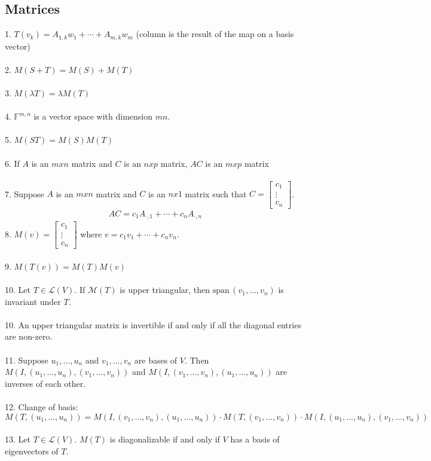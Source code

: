\documentclass[11pt,reqno]{article}
\newcommand{\spn}{\mathrm{span\,}}
\newcommand{\F}{\mathbb{F}}
\theoremstyle{definition}
\begin{document}
\subsection*{Matrices}
1. $T(v_k) = A_{1,k}w_1 + \cdots + A_{m,k}w_m$ (column is the result of the map on a basis vector)\\\\
2. $M(S+T) = M(S) + M(T)$\\\\
3. $M(\lambda T) = \lambda M(T)$\\\\
4. $\F^{m,n}$ is a vector space with dimension $mn$.\\\\
5. $M(ST) = M(S)M(T)$\\\\
6. If $A$ is an $mxn$ matrix and $C$ is an $nxp$ matrix, $AC$ is an $mxp$ matrix\\\\
7. Suppose $A$ is an $mxn$ matrix and $C$ is an $nx1$ matrix such that $C = 
\begin{bmatrix}
    c_1\\
    \vdots\\
    c_n
\end{bmatrix}$.
\begin{align*}
    AC = c_1A_{\cdot,1}+\cdots+c_nA_{\cdot,n}
\end{align*}
8. $M(v) = 
\begin{bmatrix}
    c_1\\
    \vdots\\
    c_n
\end{bmatrix}$
where $v = c_1v_1 + \cdots + c_nv_n$.\\\\
9. $M(T(v)) = M(T)M(v)$\\\\
10. Let $T\in\mathcal{L}(V)$. If $\mathcal{M}(T)$ is upper triangular, then $\spn(v_1,\ldots,v_n)$ is invariant under $T$.\\\\
10. An upper triangular matrix is invertible if and only if all the diagonal entries are non-zero.\\\\
11. Suppose $u_1,\ldots,u_n$ and $v_1,\ldots,v_n$ are bases of $V$. Then $M(I, (u_1,\ldots,u_n), (v_1,\ldots,v_n))$ and $M(I, (v_1,\ldots,v_n), (u_1,\ldots,u_n))$ are inverses of each other.\\\\
12. Change of basis: $M(T, (u_1,\ldots,u_n)) = M(I, (v_1,\ldots,v_n), (u_1,\ldots,u_n)) \cdot M(T, (v_1,\ldots,v_n)) \cdot M(I, (u_1,\ldots,u_n), (v_1,\ldots,v_n))$\\\\
13. Let $T\in\mathcal{L}(V)$. $M(T)$ is diagonalizable if and only if $V$ has a basis of eigenvectors of $T$.
\end{document}
